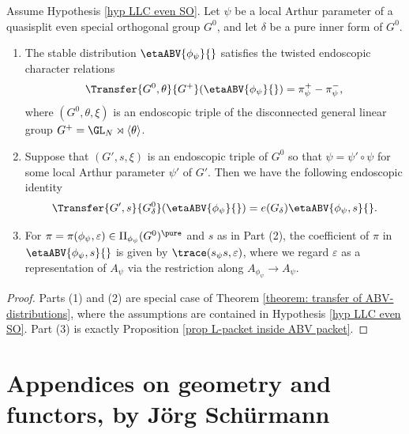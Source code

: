 \documentclass[11pt,letterpaper]{amsart}
\numberwithin{equation}{section}
\begin{document}
\begin{corollary}\label{cor ABV SO even ECR}
Assume Hypothesis \ref{hyp LLC even SO}.
    Let $\psi$ be a local Arthur parameter of a quasisplit even special orthogonal group $G^0$, and let $\delta$ be a pure inner form of $G^0$.
    \begin{enumerate}
        \item [(1)] The stable distribution $\etaABV{\phi_{\psi}}{}$ satisfies the twisted endoscopic character relations
        \[ \Transfer{G^0, \theta}{G^+} (\etaABV{\phi_{\psi}}{}) = \pi_{\psi}^+- \pi_{\psi}^-,\]
        where $(G^0, \theta, \xi)$ is an endoscopic triple of the disconnected general linear group
        $G^+= \GL_N \rtimes \langle \theta \rangle$.
        \item [(2)] Suppose that $(G',s,\xi)$ is an endoscopic triple of $G^0$ so that $\psi= \psi' \circ \psi$ for some local Arthur parameter $\psi'$ of $G'$. Then we have the following endoscopic identity
        \[ \Transfer{G',s}{G_{\delta}^0} (\etaABV{\phi_{\psi}}{})= e(G_{\delta})\etaABV{\phi_{\psi},s}{}.\]
        \item [(3)] For $\pi= \pi(\phi_{\psi}, \varepsilon) \in \Pi_{\phi_{\psi}}(G^0)^\pure$ and $s$ as in Part (2), the coefficient of $\pi$ in $\etaABV{\phi_{\psi},s}{}$ is given by $\trace(s_{\psi}s, \varepsilon)$, where we regard $\varepsilon $ as a representation of $A_{\psi}$ via the restriction along $A_{\phi_{\psi}} \to A_{\psi}$.
    \end{enumerate}
\end{corollary}
\begin{proof}
    Parts (1) and (2) are special case of Theorem \ref{theorem: transfer of ABV-distributions}, where the assumptions are contained in Hypothesis \ref{hyp LLC even SO}. Part (3) is exactly Proposition \ref{prop L-packet inside ABV packet}.
\end{proof}







\appendix

\part{Appendices on geometry and functors, by Jörg Schürmann}\label{part: VI Schurmann}

\pagestyle{appendixstyle}
\thispagestyle{appendixstyle}
\end{document}
